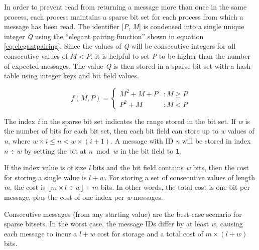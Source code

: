 \documentclass[lnicst]{svmultln}
\begin{document}
    In order to prevent read from returning a message more than once in the same process, each process maintains a sparse bit set for each process from which a message has been read. The identifier [\textit{P}, \textit{M}] is condensed into a single unique integer \textit{Q} using the ``elegant pairing function''\cite{szudzikelegant} shown in equation \ref{eq:elegantpairing}. Since the values of \textit{Q} will be consecutive integers for all consecutive values of $M < P$, it is helpful to set \textit{P} to be higher than the number of expected messages. The value \textit{Q} is then stored in a sparse bit set with a hash table using integer keys and bit field values.

 \begin{equation}
   f(M,P) = \left\{
     \begin{array}{lr}
       M^{2} + M + P & : M \geq P \\
       P^{2} + M & : M < P
     \end{array}
   \right.
   \label{eq:elegantpairing}
\end{equation}

The index \textit{i} in the sparse bit set indicates the range stored in the bit set. If \textit{w} is the number of bits for each bit set, then each bit field can store up to \textit{w} values of \textit{n}, where $w \times i \leq n < w \times (i + 1)$. A message with ID \textit{n} will be stored in index $n \div w$ by setting the bit at $n \bmod w$ in the bit field to \texttt{1}.

If the index value is of size \textit{l} bits and the bit field contains \textit{w} bits, then the cost for storing a single value is $l + w$. For storing a set of consecutive values of length \textit{m}, the cost is $\lfloor m \times l \div w\rfloor + m$ bits. In other words, the total cost is one bit per message, plus the cost of one index per \textit{w} messages.

%

Consecutive messages (from any starting value) are the best-case scenario for sparse bitsets. In the worst case, the message IDs differ by at least \textit{w}, causing each message to incur a $l + w$ cost for storage and a total cost of $m \times (l + w)$ bits.
\end{document}
